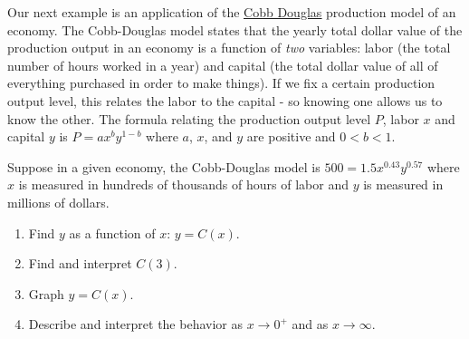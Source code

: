 \documentclass{ximera}
\begin{document}
 Our next example is an application of the  \href{https://en.wikipedia.org/wiki/Cobb-Douglas_production_function}{\underline{Cobb Douglas}} production model of an economy.  The Cobb-Douglas model states that the yearly total dollar value of the production output in an economy is a function of \textit{two} variables:   labor (the total number of hours worked in a year) and capital (the total dollar value of all of everything purchased in order to make things).  If we fix a certain production output level, this relates the labor to the capital - so knowing one allows us to know the other.   The formula relating the production output level $P$, labor $x$ and capital $y$ is $P = a x^{b} y^{1-b}$ where $a$, $x$, and $y$ are positive and $0 < b < 1$.    

\begin{example} \label{CobbDouglasEx}  Suppose in a given economy, the Cobb-Douglas model is $500 = 1.5 x^{0.43} y^{0.57}$ where $x$ is measured in hundreds of thousands of hours of labor and $y$ is measured in millions of dollars.

\begin{enumerate}

\item  Find $y$ as a function of $x$:  $y = C(x)$.  

\item  Find and interpret $C(3)$.

\item Graph $y = C(x)$.  

\item Describe and interpret the behavior as $x \rightarrow 0^{+}$ and as $x \rightarrow \infty$.

\end{enumerate}


\end{example}





\closegraphsfile
\end{document}
